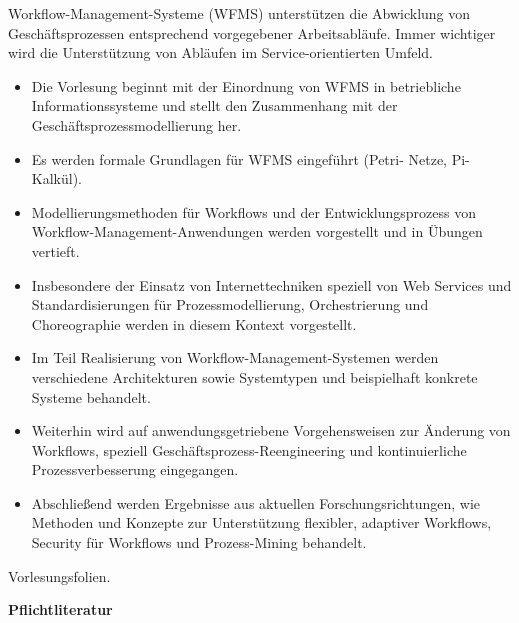 \begin{course}
\begin{learningoutcomes}
\end{learningoutcomes}

\begin{content}
Workflow-Management-Systeme (WFMS) unterstützen die Abwicklung von Geschäftsprozessen entsprechend vorgegebener Arbeitsabläufe. Immer wichtiger wird die Unterstützung von Abläufen im Service-orientierten Umfeld.

 \begin{itemize}\item Die Vorlesung beginnt mit der Einordnung von WFMS in betriebliche Informationssysteme und stellt den Zusammenhang mit der Geschäftsprozessmodellierung her.  \item Es werden formale Grundlagen für WFMS eingeführt (Petri- Netze, Pi-Kalkül).  \item Modellierungsmethoden für Workflows und der Entwicklungsprozess von Workflow-Management-Anwendungen werden vorgestellt und in Übungen vertieft.  \item Insbesondere der Einsatz von Internettechniken speziell von Web Services und Standardisierungen für Prozessmodellierung, Orchestrierung und Choreographie werden in diesem Kontext vorgestellt.  \item Im Teil Realisierung von Workflow-Management-Systemen werden verschiedene Architekturen sowie Systemtypen und beispielhaft konkrete Systeme behandelt.  \item Weiterhin wird auf anwendungsgetriebene Vorgehensweisen zur Änderung von Workflows, speziell Geschäftsprozess-Reengineering und kontinuierliche Prozessverbesserung eingegangen.  \item  Abschließend werden Ergebnisse aus aktuellen Forschungsrichtungen, wie Methoden und Konzepte zur Unterstützung flexibler, adaptiver Workflows, Security für Workflows und Prozess-Mining behandelt.  \end{itemize}
\end{content}

\begin{media}Vorlesungsfolien.

\end{media}

\begin{literature}\textbf{Pflichtliteratur}


\end{literature}
\end{course}
